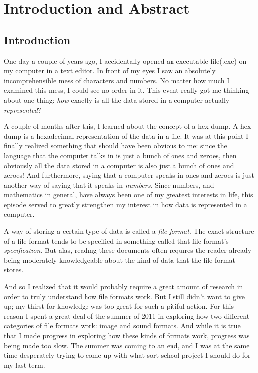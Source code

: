 \begin{comment}
  
\end{comment}

\chapter{Introduction and Abstract}

\section{Introduction}

One day a couple of years ago, I accidentally opened an executable
file(.exe) on my computer in a text editor. In front of my eyes I saw
an absolutely incomprehensible mess of characters and numbers. No
matter how much I examined this mess, I could see no order in it. This
event really got me thinking about one thing: \textit{how} exactly is
all the data stored in a computer actually \textit{represented}?

A couple of months after this, I learned about the concept of a hex
dump. A hex dump is a hexadecimal representation of the data in a
file. It was at this point I finally realized something that should
have been obvious to me: since the language that the computer talks in
is just a bunch of ones and zeroes, then obviously all the data stored
in a computer is also just a bunch of ones and zeroes! And
furthermore, saying that a computer speaks in ones and zeroes is just
another way of saying that it speaks in \textit{numbers}. Since
numbers, and mathematics in general, have always been one of my
greatest interests in life, this episode served to greatly strengthen
my interest in how data is represented in a computer.

A way of storing a certain type of data is called a \textit{file
  format}. The exact structure of a file format tends to be specified
in something called that file format's \textit{specification}. But
alas, reading these documents often requires the reader already being
moderately knowledgeable about the kind of data that the file format
stores.

And so I realized that it would probably require a great amount of
research in order to truly understand how file formats work. But I
still didn't want to give up; my thirst for knowledge was too great
for such a pitiful action.  For this reason I spent a great deal of
the summer of 2011 in exploring how two different categories of file
formats work: image and sound formats. And while it is true that I
made progress in exploring how these kinds of formats work, progress
was being made too slow. The summer was coming to an end, and I was at
the same time desperately trying to come up with what sort school
project I should do for my last term.

